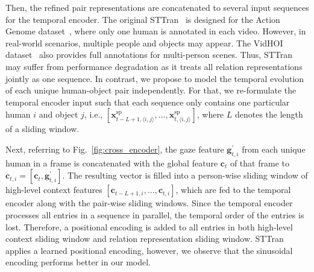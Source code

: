 \documentclass[times,twocolumn,final,authoryear]{elsarticle}
\begin{document}
Then, the refined pair representations are concatenated to several input sequences for the temporal encoder. The original STTran~\citep{hoi_v2:sttran} is designed for the Action Genome dataset~\citep{hoi_v_set:action_genome}, where only one human is annotated in each video. However, in real-world scenarios, multiple people and objects may appear. The VidHOI dataset~\citep{hoi_v_set:VidHOI} also provides full annotations for multi-person scenes. Thus, STTran may suffer from performance degradation as it treats all relation representations jointly as one sequence. In contrast, we propose to model the temporal evolution of each unique human-object pair independently. For that, we re-formulate the temporal encoder input such that each sequence only contains one particular human $i$ and object $j$, i.e., $[\mathbf{x}_{t-L+1,\langle i,j \rangle}^\text{sp}, \dots, \mathbf{x}_{t,\langle i,j \rangle}^\text{sp}]$, where $L$ denotes the length of a sliding window.

Next, referring to Fig.~\ref{fig:cross_encoder}, the gaze feature $\mathbf{g}^\prime_{t,i}$ from each unique human in a frame is concatenated with the global feature $\mathbf{c}_t$ of that frame to $\mathbf{c}_{t, i}=[\mathbf{c}_t, \mathbf{g}^\prime_{t, i}]$. The resulting vector is filled into a person-wise sliding window of high-level context features $[\mathbf{c}_{t-L+1, i}, \dots, \mathbf{c}_{t, i}]$, which are fed to the temporal encoder along with the pair-wise sliding windows. Since the temporal encoder processes all entries in a sequence in parallel, the temporal order of the entries is lost. Therefore, a positional encoding is added to all entries in both high-level context sliding window and relation representation sliding window. STTran~\citep{hoi_v2:sttran} applies a learned positional encoding, however, we observe that the sinusoidal encoding performs better in our model.
\end{document}
